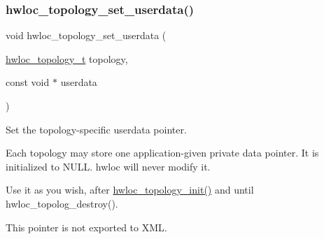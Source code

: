 \subsubsection{\texorpdfstring{hwloc\+\_\+topology\+\_\+set\+\_\+userdata()}{hwloc\_topology\_set\_userdata()}}
{\footnotesize\ttfamily void hwloc\+\_\+topology\+\_\+set\+\_\+userdata (\begin{DoxyParamCaption}\item[{\hyperlink{a00186_ga9d1e76ee15a7dee158b786c30b6a6e38}{hwloc\+\_\+topology\+\_\+t}}]{topology,  }\item[{const void $\ast$}]{userdata }\end{DoxyParamCaption})}



Set the topology-\/specific userdata pointer. 

Each topology may store one application-\/given private data pointer. It is initialized to {\ttfamily N\+U\+LL}. hwloc will never modify it.

Use it as you wish, after \hyperlink{a00186_ga03fd4a16d8b9ee1ffc32b25fd2f6bdfa}{hwloc\+\_\+topology\+\_\+init()} and until hwloc\+\_\+topolog\+\_\+destroy().

This pointer is not exported to X\+ML. 